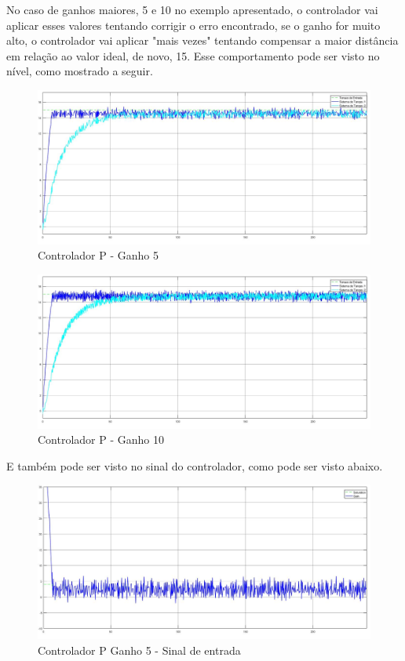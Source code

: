 \documentclass[
	12pt,				%
	openany,			%
	oneside,			%
	a4paper,			%
	english,			%
	french,				%
	spanish,			%
	brazil,				%
	]{abntex2}
\begin{document}
{No caso de ganhos maiores, 5 e 10 no exemplo apresentado, o controlador vai aplicar esses valores tentando corrigir o erro encontrado, se o ganho for muito alto, o controlador vai aplicar "mais vezes" tentando compensar a maior distância em relação ao valor ideal, de novo, 15. Esse comportamento pode ser visto no nível, como mostrado a seguir.

\begin{figure}[h]
	\centering
	\includegraphics[scale=0.30]{controlador_p_ganho_5.jpg}
	\caption{Controlador P - Ganho 5}
\end{figure}

\begin{figure}[h]
	\centering
	\includegraphics[scale=0.30]{controlador_p_ganho_10.jpg}
	\caption{Controlador P - Ganho 10}
\end{figure}

E também pode ser visto no sinal do controlador, como pode ser visto abaixo.

\begin{figure}[h]
	\centering
	\includegraphics[scale=0.33]{osciloscopio_ganho_5.jpg}
	\caption{Controlador P Ganho 5 - Sinal de entrada}
	\label{fig:controladorPG5}
\end{figure}

}
\end{document}
